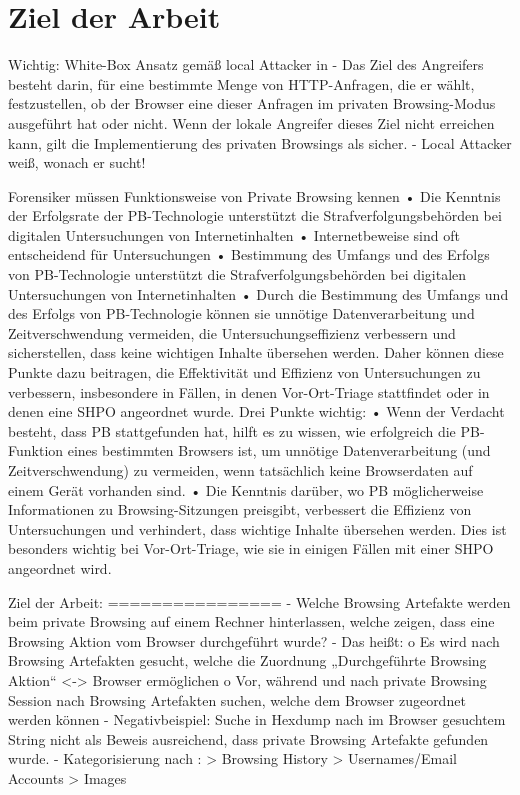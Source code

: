 \chapter{Ziel der Arbeit}

Wichtig: White-Box Ansatz gemäß local Attacker in \cite{Aggarwal.2010}
	-	Das Ziel des Angreifers besteht darin, für eine bestimmte Menge von HTTP-Anfragen, die er wählt, festzustellen, ob der Browser eine dieser Anfragen im privaten Browsing-Modus ausgeführt hat oder nicht. Wenn der lokale Angreifer dieses Ziel nicht erreichen kann, gilt die Implementierung des privaten Browsings als sicher.
	- Local Attacker weiß, wonach er sucht!
	


Forensiker müssen Funktionsweise von Private Browsing kennen \cite{Horsman.2019}
	•	Die Kenntnis der Erfolgsrate der PB-Technologie unterstützt die Strafverfolgungsbehörden bei digitalen Untersuchungen von Internetinhalten
	•	Internetbeweise sind oft entscheidend für Untersuchungen
	•	Bestimmung des Umfangs und des Erfolgs von PB-Technologie unterstützt die Strafverfolgungsbehörden bei digitalen Untersuchungen von Internetinhalten
	•	Durch die Bestimmung des Umfangs und des Erfolgs von PB-Technologie können sie unnötige Datenverarbeitung und Zeitverschwendung vermeiden, die Untersuchungseffizienz verbessern und sicherstellen, dass keine wichtigen Inhalte übersehen werden. Daher können diese Punkte dazu beitragen, die Effektivität und Effizienz von Untersuchungen zu verbessern, insbesondere in Fällen, in denen Vor-Ort-Triage stattfindet oder in denen eine SHPO angeordnet wurde. Drei Punkte wichtig:
	•	Wenn der Verdacht besteht, dass PB stattgefunden hat, hilft es zu wissen, wie erfolgreich die PB-Funktion eines bestimmten Browsers ist, um unnötige Datenverarbeitung (und Zeitverschwendung) zu vermeiden, wenn tatsächlich keine Browserdaten auf einem Gerät vorhanden sind.
	•	Die Kenntnis darüber, wo PB möglicherweise Informationen zu Browsing-Sitzungen preisgibt, verbessert die Effizienz von Untersuchungen und verhindert, dass wichtige Inhalte übersehen werden. Dies ist besonders wichtig bei Vor-Ort-Triage, wie sie in einigen Fällen mit einer SHPO angeordnet wird.
	


Ziel der Arbeit:
================
-	Welche Browsing Artefakte werden beim private Browsing auf einem Rechner hinterlassen, welche zeigen, dass eine Browsing Aktion vom Browser durchgeführt wurde?
-	Das heißt: 
	o	Es wird nach Browsing Artefakten gesucht, welche die Zuordnung „Durchgeführte Browsing Aktion“ <-> Browser ermöglichen
	o	Vor, während und nach private Browsing Session nach Browsing Artefakten suchen, welche dem Browser zugeordnet werden können
-	Negativbeispiel: Suche in Hexdump nach im Browser gesuchtem String nicht als Beweis ausreichend, dass private Browsing Artefakte gefunden wurde.
- Kategorisierung nach \cite{Ohana.2013}: 
	> Browsing History
	> Usernames/Email Accounts
	> Images

